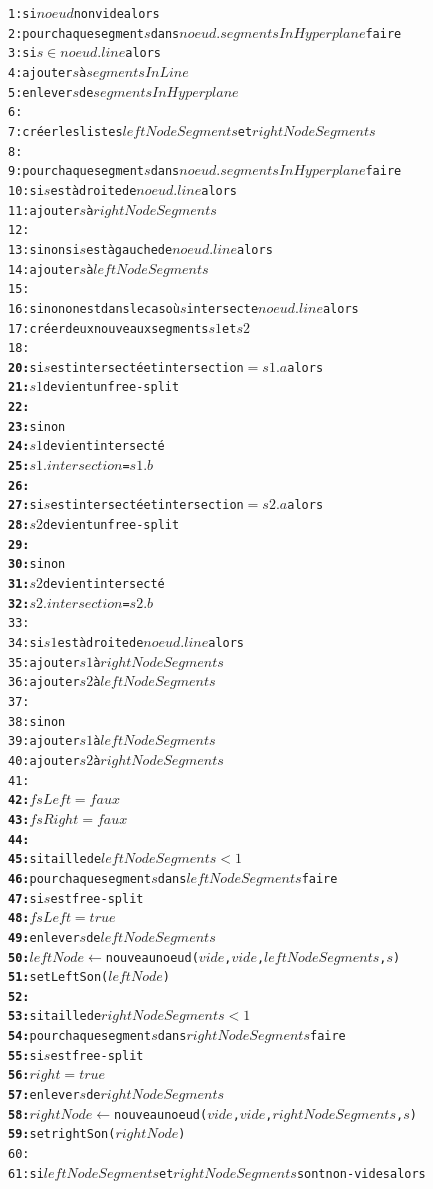 \documentclass[11pt,a4paper]{article}
\theoremstyle{definition}
\theoremstyle{remark}
\begin{document}
\begin{alltt}
 1: si \(noeud\) non vide alors
 2:   pour chaque segment \(s\) dans \(noeud.segmentsInHyperplane\) faire
 3:     si \(s \in noeud.line\) alors
 4:       ajouter \(s\) à \(segmentsInLine\)
 5:       enlever \(s\) de \(segmentsInHyperplane\)
 6:       
 7:   créer les listes \(leftNodeSegments\) et \(rightNodeSegments\)
 8:   
 9:   pour chaque segment \(s\) dans \(noeud.segmentsInHyperplane\) faire
10:     si \(s\) est à droite de \(noeud.line\) alors
11:       ajouter \(s\) à \(rightNodeSegments\)
12:
13:     sinon si \(s\) est à gauche de \(noeud.line\) alors
14:       ajouter \(s\) à \(leftNodeSegments\)
15:
16:     sinon on est dans le cas où \(s\) intersecte \(noeud.line\) alors
17:       créer deux nouveaux segments \(s1\) et \(s2\)
18:
\textbf{20:}		      si \(s\) est intersecté et intersection \(=s1.a\) alors
\textbf{21:}		        \(s1\) devient un free-split
\textbf{22:}		    
\textbf{23:}		      sinon
\textbf{24:}		        \(s1\) devient intersecté
\textbf{25:}		        \(s1.intersection\) = \(s1.b\)
\textbf{26:}		    
\textbf{27:}		      si \(s\) est intersecté et intersection \(=s2.a\) alors
\textbf{28:}		        \(s2\) devient un free-split
\textbf{29:}		    
\textbf{30:}		      sinon
\textbf{31:}		        \(s2\) devient intersecté
\textbf{32:}		        \(s2.intersection\) = \(s2.b\)
33:		
34:       si \(s1\) est à droite de \(noeud.line\) alors
35:         ajouter \(s1\) à \(rightNodeSegments\)
36:         ajouter \(s2\) à \(leftNodeSegments\)
37:
38:       sinon
39:         ajouter \(s1\) à \(leftNodeSegments\)
40:         ajouter \(s2\) à \(rightNodeSegments\)
41:   
\textbf{42:}	  \(fsLeft = faux\)
\textbf{43:}	  \(fsRight = faux\)
\textbf{44:}      
\textbf{45:}   si taille de \(leftNodeSegments < 1\)
\textbf{46:}     pour chaque segment \(s\) dans \(leftNodeSegments\) faire
\textbf{47:}       si \(s\) est free-split
\textbf{48:}         \(fsLeft = true\)
\textbf{49:}         enlever \(s\) de \(leftNodeSegments\)
\textbf{50:}         \(leftNode \leftarrow \) nouveau noeud (\(vide\), \(vide\), \(leftNodeSegments\), \(s\))
\textbf{51:}         setLeftSon(\(leftNode\))
\textbf{52:}            
\textbf{53:}    si taille de \(rightNodeSegments < 1\)
\textbf{54:}      pour chaque segment \(s\) dans \(rightNodeSegments\) faire
\textbf{55:}        si \(s\) est free-split
\textbf{56:}          \(right = true\)
\textbf{57:}          enlever \(s\) de \(rightNodeSegments\)
\textbf{58:}          \(rightNode \leftarrow \) nouveau noeud (\(vide\), \(vide\), \(rightNodeSegments\), \(s\))
\textbf{59:}          setrightSon(\(rightNode\))
60:
61:   si \(leftNodeSegments\) et \(rightNodeSegments\) sont non-vides alors

\end{alltt}
\end{document}

